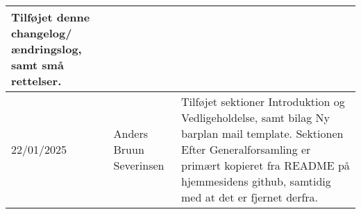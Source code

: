 \begin{tabular}{l l l}
    \begin{minipage}[t]
        {0.5\linewidth}
        Tilføjet denne changelog/ændringslog, samt små rettelser.
    \end{minipage} \\
    \hline
    \begin{minipage}[t]
        {0.15\linewidth}
        22/01/2025
    \end{minipage} &
    \begin{minipage}[t]
        {0.35\linewidth}
        Anders Bruun Severinsen
    \end{minipage} & 
    \begin{minipage}[t]
        {0.5\linewidth}
        Tilføjet sektioner Introduktion og Vedligeholdelse, samt bilag Ny barplan mail template.
        Sektionen Efter Generalforsamling er primært kopieret fra README på hjemmesidens 
        github, samtidig med at det er fjernet derfra.
    \end{minipage} \\
    \hline
\end{tabular}

